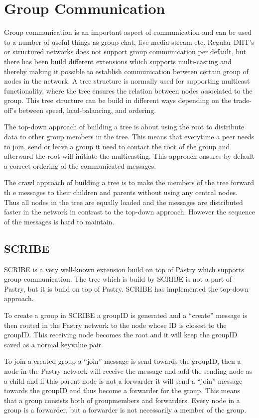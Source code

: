 \section{Group Communication}
Group communication is an important aspect of communication and can be used to a number of useful things as group chat, live media stream etc.
Regular DHT's or structured networks does not support group communication per default, but there has been build different extensions which supports multi-casting and thereby making it possible to establish communication between certain group of nodes in the network. 
A tree structure is normally used for supporting multicast functionality, where the tree ensures the relation between nodes associated to the group. This tree structure can be build in different ways depending on the trade-off's between speed, load-balancing, and ordering.

The top-down approach of building a tree is about using the root to distribute data to other group members in the tree. This means that everytime a peer needs to join, send or leave a group it need to contact the root of the group and afterward the root will initiate the multicasting. This approach ensures by default a correct ordering of the communicated messages. 

The crawl approach of building a tree is to make the members of the tree forward th e messages to their children and parents without using any central nodes. Thus all nodes in the tree are equally loaded and the messages are distributed faster in the network in contrast to the top-down approach. However the sequence of the messages is hard to maintain. 

\subsection{SCRIBE}
SCRIBE is a very well-known extension build on top of Pastry which supports group communication. 
The tree which is build by SCRIBE is not a part of Pastry, but it is build on top of Pastry. SCRIBE has implemented the top-down approach. 

To create a group in SCRIBE a groupID is generated and a ``create'' message is then routed in the Pastry network to the node whose ID is closest to the groupID. This receiving node becomes the root and it will keep the groupID saved as a normal keyvalue pair.

To join a created group a ``join'' message is send towards the groupID, then a node in the Pastry network will receive the message and add the sending node as a child and if this parent node is not a forwarder it will send a ``join'' message towards the groupID and thus become a forwarder for the group. This means that a group consists both of groupmembers and forwarders. Every node in a group is a forwarder, but a forwarder is not necessarily a member of  the group. 

